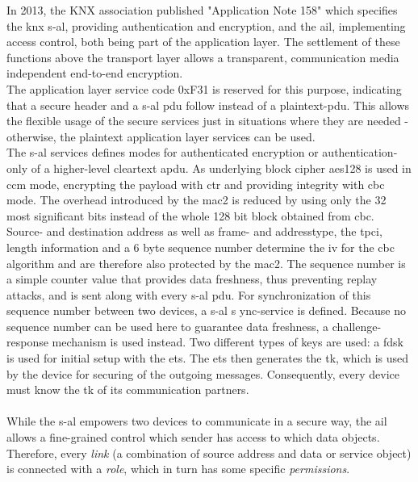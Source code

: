 In 2013, the KNX association published "Application Note 158" \cite{knx_data_sec} which specifies the \gls{knx} \gls{s-al}, providing
authentication and encryption, and the \gls{ail}, implementing access control, both being part of the application layer.
The settlement of these functions above the transport layer allows a transparent, communication media independent end-to-end encryption.
\\
The application layer service code 0xF31 is reserved for this purpose, indicating that a secure header and a \gls{s-al} \gls{pdu} 
follow instead of a plaintext-\gls{pdu}. This allows the flexible usage of the secure services just in situations where they are needed - otherwise, the plaintext application
layer services can be used.
\\
The \gls{s-al} services defines modes for authenticated encryption or authentication-only of a higher-level cleartext \gls{apdu}. As underlying block cipher
\gls{aes}128 is used in \gls{ccm} mode, encrypting the payload with \gls{ctr} and providing integrity with \gls{cbc} mode. The overhead introduced by the 
\gls{mac2} is reduced by 
using only the 32 most significant bits instead of the whole 128 bit block obtained from \gls{cbc}. Source- and destination address as well as
frame- and addresstype, the \gls{tpci}, length information and a 6 byte sequence number determine the \gls{iv} for the \gls{cbc} algorithm and are therefore also protected by the \gls{mac2}.
The sequence number is a simple counter value that provides data freshness, thus preventing replay attacks, and is sent along with every \gls{s-al} \gls{pdu}.
For synchronization of this sequence number between two devices, a \gls{s-al} s	ync-service is defined. Because no sequence number can be used here to guarantee
data freshness, a challenge-response mechanism is used instead.
Two different types of keys are used: a \gls{fdsk} is used for initial setup with the \gls{ets}. The \gls{ets} then generates the \gls{tk}, which is used by the
device for securing of the outgoing messages. Consequently, every device must know the \gls{tk} of its communication partners.
\\
\\
While the \gls{s-al} empowers two devices to communicate in a secure way, the \gls{ail} allows a fine-grained control which sender has access to which
data objects. Therefore, every \textit{link} (a combination of source address and data or service object) is connected with a \textit{role}, which in turn
has some specific \textit{permissions}. 

